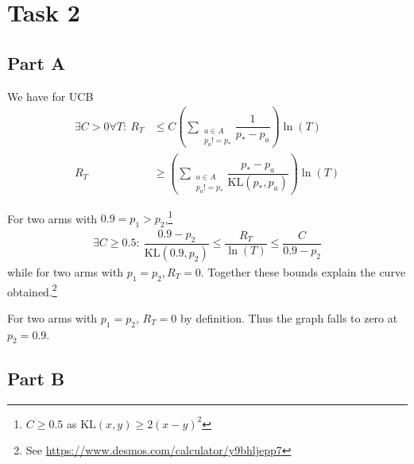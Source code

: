 \section*{Task 2}
\subsection*{Part A}
\begin{figure}[h]
    \centering
    
\end{figure}

We have for UCB
\begin{align*}
    \exists C > 0 \forall T: ~ R_T &\leq  C\left(\sum{}_{\substack{a\in A\\ p_a != p_*}}\dfrac{1}{p_* - p_a}\right)\ln(T) \\
    R_T &\geq \left(\sum{}_{\substack{a\in A\\ p_a != p_*}}\dfrac{p_* - p_a}{\text{KL}(p_*, p_a)}\right)\ln(T)
\end{align*}

For two arms with $0.9 = p_1 > p_2$,\footnote{$C\geq 0.5$ as $\text{KL}(x,y)\geq 2(x-y)^2$}
\begin{align*}
    \exists C \geq 0.5: ~ \boxed{\dfrac{0.9 - p_2}{\text{KL}(0.9, p_2)} \leq \dfrac{R_T}{\ln(T)} \leq \dfrac{C}{0.9 - p_2}}
\end{align*}
while for two arms with $\boxed{p_1 = p_2, R_T = 0}$. Together these bounds explain the curve obtained.\footnote{See \url{https://www.desmos.com/calculator/y9bhljepp7}}

For two arms with $p_1 = p_2$, $R_T = 0$ by definition. Thus the graph falls to zero at $p_2 = 0.9$.

\subsection*{Part B}
\begin{figure}[h]
    \centering
    
\end{figure}
